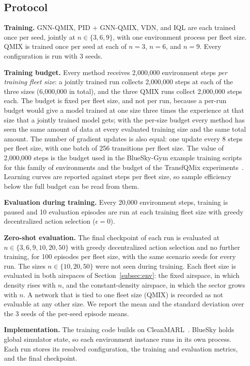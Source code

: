 \subsection{Protocol}
\label{subsec:protocol}
\textbf{Training.} GNN-QMIX, PID + GNN-QMIX, VDN, and IQL are each trained once per seed,
jointly at $n\in\{3,6,9\}$, with one environment process per fleet size. QMIX is trained
once per seed at each of $n=3$, $n=6$, and $n=9$. Every configuration is run with 3 seeds.

\textbf{Training budget.} Every method receives 2,000,000 environment steps \emph{per
training fleet size}: a jointly trained run collects 2,000,000 steps at each of the three
sizes (6,000,000 in total), and the three QMIX runs collect 2,000,000 steps each. The budget
is fixed per fleet size, and not per run, because a per-run budget would give a model
trained at one size three times the experience at that size that a jointly trained model
gets; with the per-size budget every method has seen the same amount of data at every
evaluated training size and the same total amount. The number of gradient updates is also
equal: one update every 8 steps per fleet size, with one batch of 256 transitions per fleet
size. The value of 2,000,000 steps is the budget used in the BlueSky-Gym example training
scripts for this family of environments and the budget of the TransfQMix
experiments~\cite{transfqmix}. Learning curves are reported against steps per fleet size, so
sample efficiency below the full budget can be read from them.

\textbf{Evaluation during training.} Every 20,000 environment steps, training is paused and
10 evaluation episodes are run at each training fleet size with greedy decentralized action
selection ($\epsilon=0$).

\textbf{Zero-shot evaluation.} The final checkpoint of each run is evaluated at
$n\in\{3,6,9,10,20,50\}$ with greedy decentralized action selection and no further
training, for 100 episodes per fleet size, with the same scenario seeds for every run. The
sizes $n\in\{10,20,50\}$ were not seen during training. Each fleet size is evaluated in both
airspaces of Section~\ref{subsec:env}: the fixed airspace, in which density rises with $n$,
and the constant-density airspace, in which the sector grows with $n$. A network that is tied
to one fleet size (QMIX) is recorded as not evaluable at any other size. We report the mean
and the standard deviation over the 3 seeds of the per-seed episode means.

\textbf{Implementation.} The training code builds on CleanMARL~\cite{cleanmarl}. BlueSky
holds global simulator state, so each environment instance runs in its own process. Each
run stores its resolved configuration, the training and evaluation metrics, and the final
checkpoint.

